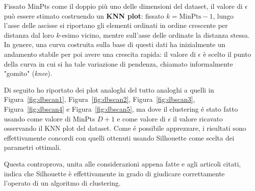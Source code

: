 \documentclass[a4paper, 12pt]{report}
\begin{document}
			Fissato MinPts come il doppio più uno delle dimensioni del dataset,
			il valore di $\epsilon$ può essere stimato costruendo un \textbf{KNN
			plot}: fissato $k = \textrm{MinPts} - 1$, lungo l'asse delle ascisse
			si riportano gli elementi ordinati in ordine crescente per distanza
			dal loro $k$-esimo vicino, mentre sull'asse delle ordinate la distanza
			stessa. In genere, una curva costruita sulla base di questi dati ha
			inizialmente un andamento stabile per poi avere una crescita rapida:
			il valore di $\epsilon$ è scelto il punto della curva in cui si ha
			tale variazione di pendenza, chiamato informalmente "gomito"
			(\emph{knee}).

			Di seguito ho riportato dei plot analoghi del tutto analoghi a
			quelli in Figura~\ref{fig:dbscan1}, Figura~\ref{fig:dbscan2},
			Figura~\ref{fig:dbscan3}, Figura~\ref{fig:dbscan4} e
			Figura~\ref{fig:dbscan5}, ma dove il clustering é stato fatto
			usando come valore di MinPts $D + 1$ e come valore di $\epsilon$
			il valore ricavato osservando il KNN plot del dataset. Come é
			possibile apprezzare, i risultati sono effettivamente concordi
			con quelli ottenuti usando Silhouette come scelta dei parametri
			ottimali.

			Questa controprova, unita alle considerazioni appena fatte e agli
			articoli citati, indica che Silhouette è effettivamente in grado
			di giudicare correttamente l'operato di un algoritmo di clustering.
\end{document}
